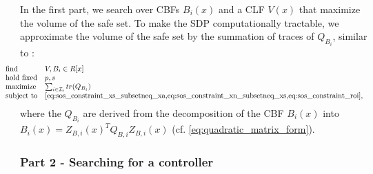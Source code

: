 In the first part, we search over CBFs $B_i(x)$ and a CLF $V(x)$ that maximize the volume of the safe set.
To make the SDP computationally tractable, we approximate the volume of the safe set by the summation of traces of $Q_{B_i}$, similar to \cite{WangHan:18,KunduGeng:19}:
\begin{align*} 
   \hspace{-\leftmargin}
   \begin{array}{lll}
      \mbox{find} & V, B_i \in R[x] \\
      \mbox{hold fixed} & p, s \\
      \mbox{maximize} & \sum_{i \in \mathcal I_t} tr(Q_{B_i}) \\
      \mbox{subject to} & \text{\cref{eq:sos_constraint_xs_subsetneq_xa,eq:sos_constraint_xn_subsetneq_xs,eq:sos_constraint_roi}}, \\
   \end{array}
\end{align*}
where the $Q_{B_i}$ are derived from the decomposition of the CBF $B_i(x)$ into $B_i(x) = Z_{B,i}(x)^T Q_{B,i} Z_{B,i}(x)$ (cf. \cref{eq:quadratic_matrix_form}).



\subsubsection*{Part 2 - Searching for a controller}

